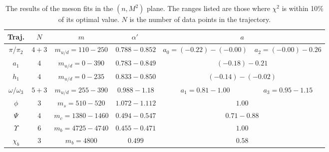 \documentclass[11pt,a4]{article}
\newcommand{\alp}{\ensuremath{\alpha'\:}}
\newcommand{\mud}{m_{u/d}}
\begin{document}
				\begin{table}[tp!] \centering
					\begin{tabular}{|c|c|c|c|cc|} \hline
					Traj. & \(N\) & \(m\) & \alp & \multicolumn{2}{|c|}{\(a\)} \\ \hline
					
					\(\pi\)/\(\pi_2\) & \(4+3\) & {\(\mud = 110-250\)} & \(0.788-0.852\) & \(a_0 = (-0.22)-(-0.00)\) & \(a_2 = (-0.00)-0.26\) \\
					
					\(a_1\) & \(4\) & \(\mud = 0-390\) & \(0.783-0.849\) & \multicolumn{2}{|c|}{\((-0.18)-0.21\)} \\
					
					\(h_1\) & \(4\) & \(\mud = 0-235\) & \(0.833-0.850\) & \multicolumn{2}{|c|}{\((-0.14)-(-0.02)\)} \\
					
					\(\omega/\omega_3\) & \(5+3\) & \(\mud = 255-390\) & \(0.988-1.18\) & \(a_1 = 0.81-1.00\) & \(a_3 = 0.95-1.15\) \\
					
					\(\phi\) & \(3\) & \(m_s = 510-520\) & \(1.072-1.112\) & \multicolumn{2}{|c|}{\(1.00\)} \\
					
					\(\Psi\) & \(4\) & \(m_c = 1380-1460\) & \(0.494-0.547\) & \multicolumn{2}{|c|}{\(0.71-0.88\)} \\
					
					\(\Upsilon\) & \(6\) & \(m_b = 4725-4740\) & \(0.455-0.471\) & \multicolumn{2}{|c|}{\(1.00\)} \\
					
					\(\chi_b\) & \(3\) & \(m_b = 4800\) & \(0.499\) & \multicolumn{2}{|c|}{\(0.58\)} \\	\hline \end{tabular}
					
					\caption{\label{tab:mes_n} The results of the meson fits in the \((n,M^2)\) plane. The ranges listed are those where \(\chi^2\) is within 10\% of its optimal value. \(N\) is the number of data points in the trajectory.}
				\end{table}
				
\end{document}
